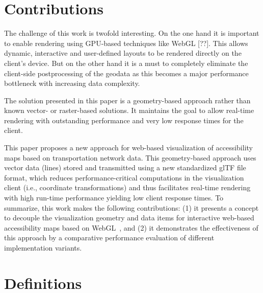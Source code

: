   \section{Contributions}
    \label{sec:intro:contr}
    The challenge of this work is twofold interesting. On the one hand it is important to enable rendering using GPU-based techniques like WebGL [??]. This allows dynamic, interactive and user-defined layouts to be rendered directly on the client's device. But on the other hand it is a must to completely eliminate the client-side postprocessing of the geodata as this becomes a major performance bottleneck with increasing data complexity.\par
    The solution presented in this paper is a geometry-based approach rather than known vector- or raster-based solutions. It maintains the goal to allow real-time rendering with outstanding performance and very low response times for the client.\par

    This paper proposes a new approach for web-based visualization of accessibility
    maps based on transportation network data. This geometry-based approach uses vector
    data (lines) stored and transmitted using a new standardized glTF file format, which
    reduces performance-critical computations in the visualization client (i.e., coordinate
    transformations) and thus facilitates real-time rendering with high run-time performance
    yielding low client response times. To summarize, this work makes the following contributions:
    (1) it presents a concept to decouple the visualization geometry and data items for
    interactive web-based accessibility maps based on Web\-GL~\cite{Jackson2016}, and (2)
    it demonstrates the effectiveness of this approach by a comparative performance
    evaluation of different implementation variants.\par
  \section{Definitions}
    \label{sec:intro:def}
